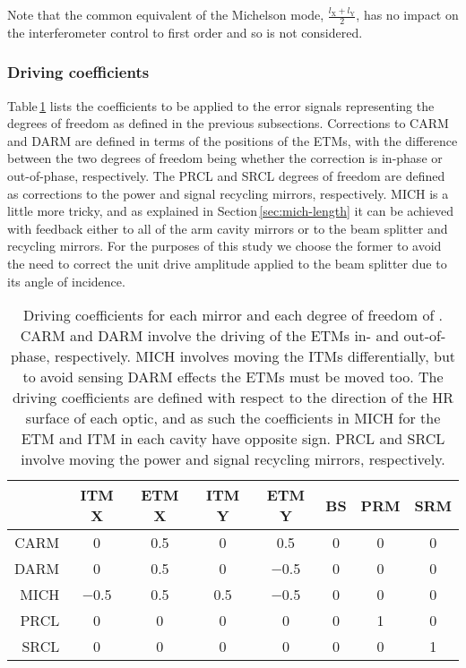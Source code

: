 Note that the common equivalent of the Michelson mode, $\frac{l_{\text{X}} + l_{\text{Y}}}{2}$, has no impact on the interferometer control to first order and so is not considered.

\subsubsection{Driving coefficients}
Table\,\ref{tab:et-lf-driving-coefficients} lists the coefficients to be applied to the error signals representing the degrees of freedom as defined in the previous subsections. Corrections to \gls{CARM} and \gls{DARM} are defined in terms of the positions of the \glspl{ETM}, with the difference between the two degrees of freedom being whether the correction is in-phase or out-of-phase, respectively. The \gls{PRCL} and \gls{SRCL} degrees of freedom are defined as corrections to the power and signal recycling mirrors, respectively. \gls{MICH} is a little more tricky, and as explained in Section\,\ref{sec:mich-length} it can be achieved with feedback either to all of the arm cavity mirrors or to the beam splitter and recycling mirrors. For the purposes of this study we choose the former to avoid the need to correct the unit drive amplitude applied to the beam splitter due to its angle of incidence.

\begin{table}
  \centering
  \begin{tabular}{r|ccccccc}
    & \textbf{\gls{ITM} X} & \textbf{\gls{ETM} X} & \textbf{\gls{ITM} Y} & \textbf{\gls{ETM} Y} & \textbf{\gls{BS}} & \textbf{\gls{PRM}} & \textbf{\gls{SRM}} \\
    \hline
    \gls{CARM} & \num{0} & \num{0.5} & \num{0} & \num{0.5} & \num{0} & \num{0} & \num{0} \\
    \gls{DARM} & \num{0} & \num{0.5} & \num{0} & \num{-0.5} & \num{0} & \num{0} & \num{0} \\
    \gls{MICH} & \num{-0.5} & \num{0.5} & \num{0.5} & \num{-0.5} & \num{0} & \num{0} & \num{0} \\
    \gls{PRCL} & \num{0} & \num{0} & \num{0} & \num{0} & \num{0} & \num{1} & \num{0} \\
    \gls{SRCL} & \num{0} & \num{0} & \num{0} & \num{0} & \num{0} & \num{0} & \num{1} \\
  \end{tabular}
  \caption[Driving coefficients for each mirror and each degree of freedom of \ETLF{}]{\label{tab:et-lf-driving-coefficients}Driving coefficients for each mirror and each degree of freedom of \ETLF{}. \gls{CARM} and \gls{DARM} involve the driving of the \glspl{ETM} in- and out-of-phase, respectively. \gls{MICH} involves moving the \glspl{ITM} differentially, but to avoid sensing \gls{DARM} effects the \glspl{ETM} must be moved too. The driving coefficients are defined with respect to the direction of the \gls{HR} surface of each optic, and as such the coefficients in \gls{MICH} for the \gls{ETM} and \gls{ITM} in each cavity have opposite sign. \gls{PRCL} and \gls{SRCL} involve moving the power and signal recycling mirrors, respectively.}
\end{table}

